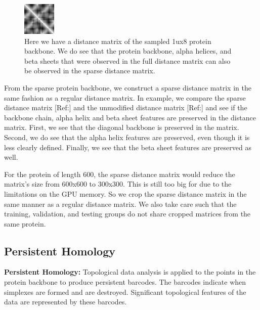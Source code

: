 \documentclass[12pt, a4paper, twocolumn, fullpage]{article}
\theoremstyle{plain}
\theoremstyle{definition}
\theoremstyle{remark}
\begin{document}
\begin{figure}[h]
    \centering
    \includegraphics[width=.7\linewidth]{1ux8pdbSparseDistM}
    \caption{Here we have a distance matrix of the sampled 1ux8 protein backbone. We do see that the protein backbone, alpha helices, and beta sheets that were observed in the full distance matrix can also be observed in the sparse distance matrix. }
    \label{1ux8pdbSparseDistM}
\end{figure}

From the sparse protein backbone, we construct a sparse distance matrix in the same fashion as a regular distance matrix. In example, we compare the sparse distance matrix [Ref:] and the unmodified distance matrix [Ref:] and see if the backbone chain, alpha helix and beta sheet features are preserved in the distance matrix. First, we see that the diagonal backbone is preserved in the matrix. Second, we do see that the alpha helix features are preserved, even though it is less clearly defined. Finally, we see that the beta sheet features are preserved as well.

For the protein of length 600, the sparse distance matrix would reduce the matrix's size from 600x600 to 300x300. This is still too big for due to the limitations on the GPU memory. So we crop the sparse distance matrix in the same manner as a regular distance matrix. We also take care such that the training, validation, and testing groups do not share cropped matrices from the same protein.



\subsection{ Persistent Homology}
\textbf{Persistent Homology: } Topological data analysis is applied to the points in the protein backbone to produce persistent barcodes. The barcodes indicate when simplexes are formed and are destroyed. Significant topological features of the data are represented by these barcodes.
\end{document}
